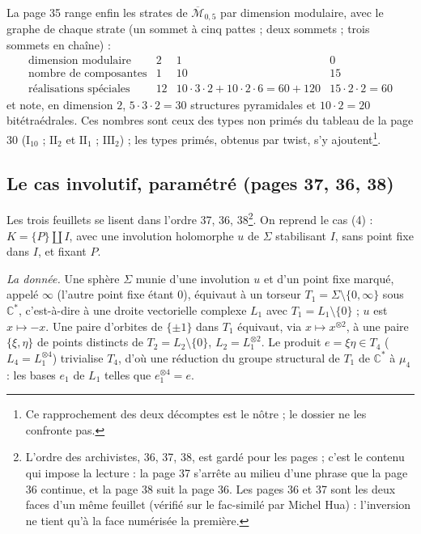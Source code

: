 \documentclass[11pt,a4paper]{article}
\begin{document}
La page 35 range enfin les strates de $\overline{\mathcal{M}}_{0,5}$ par dimension
modulaire, avec le graphe de chaque strate (un sommet à cinq pattes ; deux
sommets ; trois sommets en chaîne) :
\[
\begin{array}{llll}
\text{dimension modulaire} & 2 & 1 & 0 \\
\text{nombre de composantes} & 1 & 10 & 15 \\
\text{réalisations spéciales} & 12 & 10 \cdot 3 \cdot 2 + 10 \cdot 2 \cdot 6 =
60 + 120 & 15 \cdot 2 \cdot 2 = 60
\end{array}
\]
et note, en dimension $2$, $5 \cdot 3 \cdot 2 = 30$ structures pyramidales et
$10 \cdot 2 = 20$ bitétraédrales. Ces nombres sont ceux des types non primés du
tableau de la page 30 ($\mathrm{I}_{10}$ ; $\mathrm{II}_2$ et $\mathrm{II}_1$ ;
$\mathrm{III}_2$) ; les types primés, obtenus par twist, s'y
ajoutent\footnote{Ce rapprochement des deux décomptes est le nôtre ; le dossier
ne les confronte pas.}.

\subsection*{Le cas involutif, paramétré (pages 37, 36, 38)}

Les trois feuillets se lisent dans l'ordre 37, 36, 38\footnote{L'ordre des
archivistes, 36, 37, 38, est gardé pour les pages ; c'est le contenu qui
impose la lecture : la page 37 s'arrête au milieu d'une phrase que la page 36
continue, et la page 38 suit la page 36. Les pages 36 et 37 sont les deux faces
d'un même feuillet (vérifié sur le fac-similé par Michel Hua) : l'inversion ne
tient qu'à la face numérisée la première.}. On reprend le cas (4) : $K = \{P\}
\amalg I$, avec une involution holomorphe $u$ de $\Sigma$ stabilisant $I$, sans
point fixe dans $I$, et fixant $P$.

\emph{La donnée.} Une sphère $\Sigma$ munie d'une involution $u$ et d'un point
fixe marqué, appelé $\infty$ (l'autre point fixe étant $0$), équivaut à un
torseur $T_1 = \Sigma \setminus \{0, \infty\}$ sous $\mathbb{C}^{*}$, c'est-à-dire
à une droite vectorielle complexe $L_1$ avec $T_1 = L_1 \setminus \{0\}$ ; $u$ est
$x \mapsto -x$. Une paire d'orbites de $\{\pm 1\}$ dans $T_1$ équivaut, via $x
\mapsto x^{\otimes 2}$, à une paire $\{\xi, \eta\}$ de points distincts de $T_2 =
L_2 \setminus \{0\}$, $L_2 = L_1^{\otimes 2}$. Le produit $e = \xi \eta \in T_4$
($L_4 = L_1^{\otimes 4}$) trivialise $T_4$, d'où une réduction du groupe structural
de $T_1$ de $\mathbb{C}^{*}$ à $\mu_4$ : les bases $e_1$ de $L_1$ telles que
$e_1^{\otimes 4} = e$.
\end{document}
